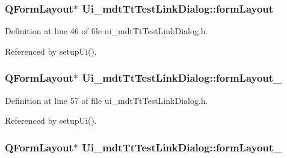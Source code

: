 \hypertarget{class_ui__mdt_tt_test_link_dialog_a8289161ceeef8a8330ff077c3db0365f}{
\subsubsection[{form\-Layout}]{\setlength{\rightskip}{0pt plus 5cm}Q\-Form\-Layout$\ast$ Ui\-\_\-mdt\-Tt\-Test\-Link\-Dialog\-::form\-Layout}}\label{class_ui__mdt_tt_test_link_dialog_a8289161ceeef8a8330ff077c3db0365f}


Definition at line 46 of file ui\-\_\-mdt\-Tt\-Test\-Link\-Dialog.\-h.



Referenced by setup\-Ui().

\hypertarget{class_ui__mdt_tt_test_link_dialog_a2f3cdfba62a998b04743cdc1b9a7fa15}{
\subsubsection[{form\-Layout\-\_\-2}]{\setlength{\rightskip}{0pt plus 5cm}Q\-Form\-Layout$\ast$ Ui\-\_\-mdt\-Tt\-Test\-Link\-Dialog\-::form\-Layout\-\_}}\label{class_ui__mdt_tt_test_link_dialog_a2f3cdfba62a998b04743cdc1b9a7fa15}


Definition at line 57 of file ui\-\_\-mdt\-Tt\-Test\-Link\-Dialog.\-h.



Referenced by setup\-Ui().

\hypertarget{class_ui__mdt_tt_test_link_dialog_a79bab5ff33988564add3f13d13972034}{
\subsubsection[{form\-Layout\-\_\-3}]{\setlength{\rightskip}{0pt plus 5cm}Q\-Form\-Layout$\ast$ Ui\-\_\-mdt\-Tt\-Test\-Link\-Dialog\-::form\-Layout\-\_}}\label{class_ui__mdt_tt_test_link_dialog_a79bab5ff33988564add3f13d13972034}


